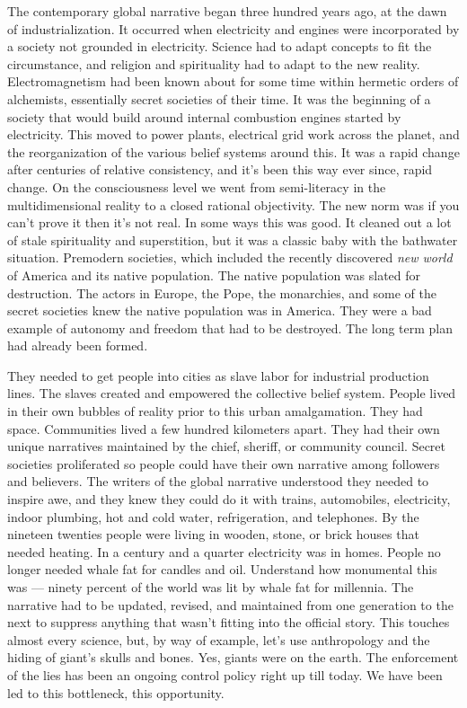 \documentclass[letterpaper,11pt,twoside,titlepage,onecolumn,openany]{book}
\begin{document}
The contemporary global narrative began three hundred years ago, at the
dawn of industrialization. It occurred when electricity and engines were
incorporated by a society not grounded in electricity. Science had to
adapt concepts to fit the circumstance, and religion and spirituality
had to adapt to the new reality. Electromagnetism had been known about
for some time within hermetic orders of alchemists, essentially secret
societies of their time. It was the beginning of a society that would
build around internal combustion engines started by electricity. This
moved to power plants, electrical grid work across the planet, and the
reorganization of the various belief systems around this. It was a rapid
change after centuries of relative consistency, and it's been this way
ever since, rapid change. On the consciousness level we went from
semi-literacy in the multidimensional reality to a closed rational
objectivity. The new norm was if you can't prove it then it's not real.
In some ways this was good. It cleaned out a lot of stale spirituality
and superstition, but it was a classic baby with the bathwater
situation. Premodern societies, which included the recently discovered
\emph{new world} of America and its native population. The native
population was slated for destruction. The actors in Europe, the Pope,
the monarchies, and some of the secret societies knew the native
population was in America. They were a bad example of autonomy and
freedom that had to be destroyed. The long term plan had already been
formed.

They needed to get people into cities as slave labor for industrial
production lines. The slaves created and empowered the collective belief
system. People lived in their own bubbles of reality prior to this urban
amalgamation. They had space. Communities lived a few hundred kilometers
apart. They had their own unique narratives maintained by the chief,
sheriff, or community council. Secret societies proliferated so people
could have their own narrative among followers and believers. The
writers of the global narrative understood they needed to inspire awe,
and they knew they could do it with trains, automobiles, electricity,
indoor plumbing, hot and cold water, refrigeration, and telephones. By
the nineteen twenties people were living in wooden, stone, or brick
houses that needed heating. In a century and a quarter electricity was
in homes. People no longer needed whale fat for candles and oil.
Understand how monumental this was --- ninety percent of the world was
lit by whale fat for millennia. The narrative had to be updated,
revised, and maintained from one generation to the next to suppress
anything that wasn't fitting into the official story. This touches
almost every science, but, by way of example, let's use anthropology and
the hiding of giant's skulls and bones. Yes, giants were on the earth.
The enforcement of the lies has been an ongoing control policy right up
till today. We have been led to this bottleneck, this opportunity.
\end{document}

